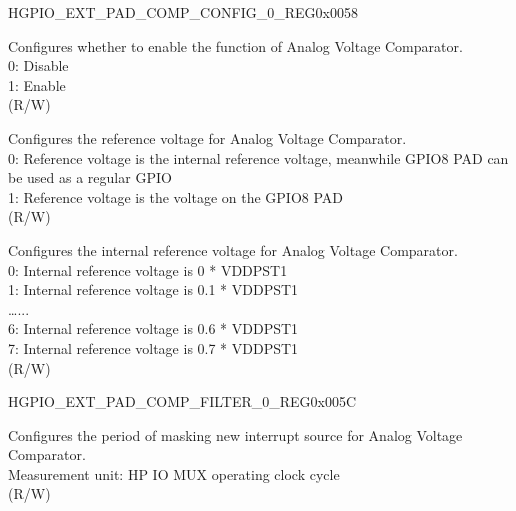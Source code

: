 \begin{register}{H}{GPIO\_EXT\_PAD\_COMP\_CONFIG\_0\_REG}{0x0058}\label{regdesc:GPIOEXTPADCOMPCONFIG0REG}
%
%
%
%
\regnewline%
\begin{regdesc}\begin{reglist}
\label{fielddesc:GPIOEXTXPDCOMP0}\item [GPIO\_EXT\_XPD\_COMP\_0] Configures whether to enable the function of Analog Voltage Comparator.\\
0: Disable\\
1: Enable\\ (R/W)
\label{fielddesc:GPIOEXTMODECOMP0}\item [GPIO\_EXT\_MODE\_COMP\_0] Configures the reference voltage for Analog Voltage Comparator. \\
0: Reference voltage is the internal reference voltage, meanwhile GPIO8 PAD can be used as a regular GPIO\\
1: Reference voltage is the voltage on the GPIO8 PAD\\ (R/W)
\label{fielddesc:GPIOEXTDREFCOMP0}\item [GPIO\_EXT\_DREF\_COMP\_0] Configures the internal reference voltage for Analog Voltage Comparator. \\
0: Internal reference voltage is 0 * VDDPST1\\
1: Internal reference voltage is 0.1 * VDDPST1\\
…...\\
6: Internal reference voltage is 0.6 * VDDPST1\\
7: Internal reference voltage is 0.7 * VDDPST1\\ (R/W)
\end{reglist}\end{regdesc}
\end{register}


\begin{register}{H}{GPIO\_EXT\_PAD\_COMP\_FILTER\_0\_REG}{0x005C}\label{regdesc:GPIOEXTPADCOMPFILTER0REG}
%
\regnewline%
\begin{regdesc}\begin{reglist}
\label{fielddesc:GPIOEXTZERODETFILTERCNT0}\item [GPIO\_EXT\_ZERO\_DET\_FILTER\_CNT\_0] Configures the period of masking new interrupt source for Analog Voltage Comparator.\\
Measurement unit: HP IO MUX operating clock cycle\\ (R/W)
\end{reglist}\end{regdesc}
\end{register}


